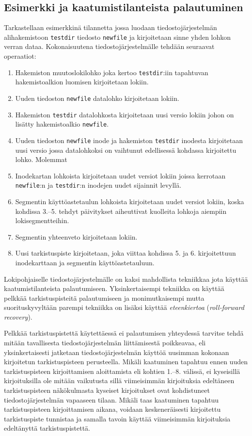 \subsection{Esimerkki ja kaatumistilanteista palautuminen}
\label{SubsectSpriteLfsExample}

Tarkastellaan esimerkkinä tilannetta jossa luodaan tiedostojärjestelmän alihakemistoon \texttt{testdir} tiedosto \texttt{newfile} ja kirjoitetaan sinne yhden lohkon verran dataa.
Kokonaisuutena tiedostojärjestelmälle tehdään seuraavat operaatiot:

\begin{enumerate}
    \item{Hakemiston muutoslokilohko joka kertoo \texttt{testdir}:iin tapahtuvan hakemistoalkion luomisen kirjoitetaan lokiin.}
    \item{Uuden tiedoston \texttt{newfile} datalohko kirjoitetaan lokiin.}
    \item{Hakemiston \texttt{testdir} datalohkosta kirjoitetaan uusi versio lokiin johon on lisätty hakemistoalkio \texttt{newfile}.}
    \item{Uuden tiedoston \texttt{newfile} inode ja hakemiston \texttt{testdir} inodesta kirjoitetaan uusi versio jossa datalohkoksi on vaihtunut edellisessä kohdassa kirjoitettu lohko. Molemmat}
    \item{Inodekartan lohkoista kirjoitetaan uudet versiot lokiin joissa kerrotaan \texttt{newfile}:n ja \texttt{testdir}:n inodejen uudet sijainnit levyllä.}
    \item{Segmentin käyttöastetaulun lohkoista kirjoitetaan uudet versiot lokiin, koska kohdissa 3.--5. tehdyt päivitykset aiheuttivat kuolleita lohkoja aiempiin lokisegmentteihin.}
    \item{Segmentin yhteenveto kirjoitetaan lokiin.}
    \item{Uusi tarkistuspiste kirjoitetaan, joka viittaa kohdissa 5. ja 6. kirjoitettuun inodekarttaan ja segmentin käyttöastetauluun.}
\end{enumerate}

Lokipohjaiselle tiedostojärjestelmälle on kaksi mahdollista tekniikkaa jota käyttää kaatumistilanteista palautumiseen.
Yksinkertaisempi tekniikka on käyttää pelkkää tarkistuspisteitä palautumiseen ja monimutkaisempi mutta suorituskyvyltään parempi tekniikka on lisäksi käyttää \emph{eteenkiertoa} (\emph{roll-forward recovery}).

Pelkkää tarkistuspistettä käytettäessä ei palautumisen yhteydessä tarvitse tehdä mitään tavallisesta tiedostojärjestelmän liittämisestä poikkeavaa,
eli yksinkertaisesti jatketaan tiedostojärjestelmän käyttöä uusimman kokonaan kirjoitetun tarkistuspisteen perusteella.
Mikäli kaatuminen tapahtuu ennen uuden tarkistuspisteen kirjoittamisen aloittamista eli kohtien 1.--8. välissä,
ei kyseisillä kirjoituksilla ole mitään vaikutusta sillä viimeisimmän kirjoituksia edeltäneen tarkistuspisteen näkökulmasta kyseiset kirjoitukset ovat kohdistuneet tiedostojärjestelmän vapaaseen tilaan.
Mikäli taas kaatuminen tapahtuu tarkistuspisteen kirjoittamisen aikana,
voidaan keskeneräisesti kirjoitettu tarkistuspiste tunnistaa ja samalla tavoin käyttää viimeisimmän kirjoituksia edeltänyttä tarkistuspistettä.

